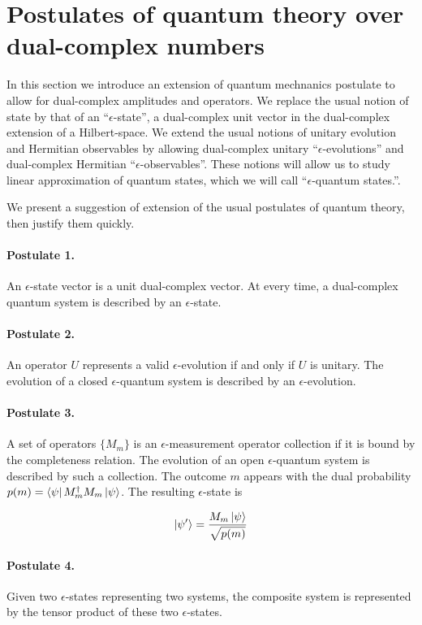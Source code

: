 \documentclass{article}
\newcommand{\e}{\epsilon}
\begin{document}
\section{Postulates of quantum theory over dual-complex numbers}

In this section we introduce an extension of quantum mechnanics postulate to allow for dual-complex amplitudes and operators.
We replace the usual notion of state by that of an ``$\e$-state'', a dual-complex unit vector in the dual-complex extension of a Hilbert-space. We extend the usual notions of unitary evolution and Hermitian observables by allowing dual-complex unitary ``$\e$-evolutions'' and dual-complex Hermitian ``$\e$-observables''.
These notions will allow us to study linear approximation of quantum states, which we will call ``$\e$-quantum states.''.

We present a suggestion of extension of the usual postulates of quantum theory, then justify them quickly.

\paragraph{Postulate 1.} An $\e$-state vector is a unit dual-complex vector. At every time, a dual-complex quantum system is described by an $\e$-state.
\paragraph{Postulate 2.} An operator $U$ represents a valid $\e$-evolution if and only if $U$ is unitary. The evolution of a closed $\e$-quantum system is described by an $\e$-evolution.
\paragraph{Postulate 3.} A set of operators $\{M_m\}$ is an $\e$-measurement operator collection if it is bound by the completeness relation. The evolution of an open $\e$-quantum system is described by such a collection. The outcome $m$ appears with the dual probability $p(m) = \bra\psi M_m^\dagger M_m \ket\psi$. The resulting $\e$-state is

\begin{equation}\label{def:meas}
 \ket{\psi'} = \frac{M_m \ket\psi}{\sqrt{p(m)}}
\end{equation}

\paragraph{Postulate 4.} Given two $\e$-states representing two systems, the composite system is represented by the tensor product of these two $\e$-states.
\end{document}
